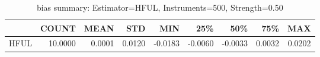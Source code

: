 \begin{table}[ht]
\centering
\caption{bias summary: Estimator=HFUL, Instruments=500, Strength=0.50}
\begin{tabular}{lrrrrrrrr}
\toprule
 & COUNT & MEAN & STD & MIN & 25\% & 50\% & 75\% & MAX \\
\midrule
HFUL & 10.0000 & 0.0001 & 0.0120 & -0.0183 & -0.0060 & -0.0033 & 0.0032 & 0.0202 \\
\bottomrule
\end{tabular}
\end{table}
